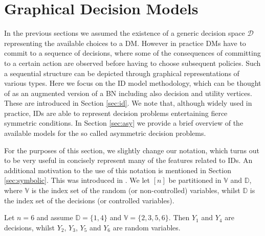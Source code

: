 \section{Graphical Decision Models}
\label{sec:dec}
In the previous sections we assumed the existence of a generic decision space $\bm{\mathcal{D}}$ representing the available choices to a \gls{DM}. However in practice \glspl{DM} have to commit to a sequence of decisions, where some of the consequences of committing to a certain action are observed before having to choose subsequent policies. Such a sequential structure can be depicted through graphical representations of various types. Here we focus on the \acrfull{ID} model methodology, which can be thought of as an augmented version of a \gls{BN} including also decision and utility vertices. 
These are introduced in Section \ref{sec:id}. We  note that, although widely used in practice, \glspl{ID} are able to represent decision problems entertaining fierce symmetric conditions. In Section \ref{sec:asy} we provide a brief overview of the available models for the so called asymmetric decision problems.
 
For the purposes of this section, we slightly change our notation, which turns out to be very useful in concisely represent many of the features related to \glspl{ID}. An additional motivation to the use of this notation is mentioned in Section \ref{sec:symbolic}. This was introduced in \citet{Leonelli2015a}. We let $[n]$ be partitioned in $\mathbb{V}$ and $\mathbb{D}$, where $\mathbb{V}$ is the index set of the random (or non-controlled) variables, whilst $\mathbb{D}$ is the index set of the decisions (or controlled variables). 

\begin{example}
Let $n=6$ and assume $\mathbb{D}=\{1,4\}$ and $\mathbb{V}=\{2,3,5,6\}$. Then $Y_1$ and $Y_4$ are decisions, whilst $Y_2$, $Y_3$, $Y_5$ and $Y_6$ are random variables. 
\end{example}

